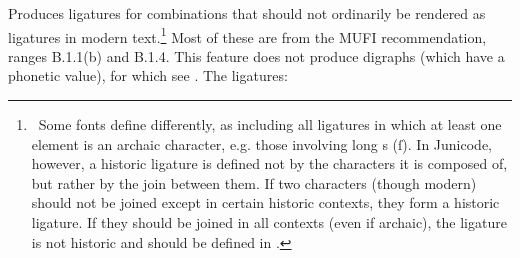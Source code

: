 Produces ligatures for combinations that should not ordinarily be rendered as
ligatures in modern text.\footnote{\ Some
fonts define  differently, as including all ligatures in which at least one
element is an archaic character, e.g.
those involving long s (\textrm{ſ\hspace{0.2em}}). In Junicode, however, a
historic ligature is defined not by the characters it is composed of, but
rather by the join between them. If two characters (though modern) should not be joined except
in certain historic contexts, they form a historic ligature. If they should be
joined in all contexts (even if archaic), the ligature is not historic
and should be defined in .} Most of these are from the MUFI recommendation,
ranges B.1.1(b) and B.1.4. This feature does
not produce digraphs (which have a phonetic value), for which see
. The ligatures:

